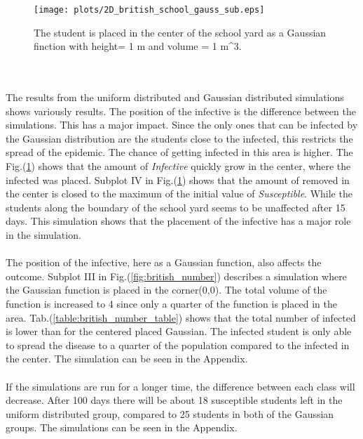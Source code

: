 \documentclass[%
twoside,                 %
final,                   %
10pt]{article}
\begin{document}
\begin{figure}[ht]
  \centerline{\texttt{[image: plots/2D\_british\_school\_gauss\_sub.eps]}}
  \caption{
  \label{fig:gauss_sub} The student is placed in the center of the school yard as a Gaussian finction with height= 1 m and volume = 1 m^3.
  }
\end{figure}


\\
\\
The results from the uniform distributed and Gaussian distributed simulations shows variously results. The position of the infective is the difference between the simulations. This has a major impact. Since the only ones that can be infected by the Gaussian distribution are the students close to the infected, this restricts the spread of the epidemic. The chance of getting infected in this area is higher. The Fig.(\ref{fig:gauss_sub}) shows that the amount of \emph{Infective} quickly grow in the center, where the infected was placed. Subplot IV in Fig.(\ref{fig:gauss_sub}) shows that the amount of removed in the center is closed to the maximum of the initial value of \emph{Susceptible}. While the students along the boundary of the school yard seems to be unaffected after 15 days. This simulation shows that the placement of the infective has a major role in the simulation.
\\
\\
The position of the infective, here as a Gaussian function, also affects the outcome. Subplot III in Fig.(\ref{fig:british_number}) describes a simulation where the Gaussian function is placed in the corner(0,0). The total volume of the function is increased to 4 since only a quarter of the function is placed in the area. Tab.(\ref{table:british_number_table}) shows that the total number of infected is lower than for the centered placed Gaussian. The infected student is only able to spread the disease to a quarter of the population compared to the infected in the center. The simulation can be seen in the Appendix.
\\
\\
If the simulations are run for a longer time, the difference between each class will decrease. After 100 days there will be about 18 susceptible students left in the uniform distributed group, compared to 25 students in both of the Gaussian groups. The simulations can be seen in the Appendix.

\end{document}
